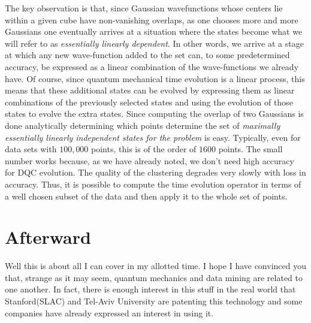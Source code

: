 \documentclass[fleqn,twoside]{article}
\begin{document}
The key observation is that, since Gaussian wavefunctions whose
centers lie within a given cube have non-vanishing overlaps, as one
chooses more and more Gaussians one eventually arrives at a
situation where the states become what we will refer to as {\it
essentially linearly dependent\/}.  In other words, we arrive at a
stage at which any new wave-function added to the set can, to some
predetermined accuracy, be expressed as a linear combination of the
wave-functions we already have.  Of course, since quantum mechanical
time evolution is a linear process, this means that these additional
states can be evolved by expressing them as linear combinations of the
previously selected states and using the evolution of those states
to evolve the extra states.  Since computing the overlap of two
Gaussians is done analytically determining which points determine
the set of {\it maximally essentially linearly independent states
for the problem\/} is easy. Typically, even for data sets with
$100,000$ points, this is of the order of $1600$ points.  The small
number works because, as we have already noted, we don't need high
accuracy for DQC evolution. The quality of the clustering degrades
very slowly with loss in accuracy. Thus, it is possible to compute the time
evolution operator in terms of a well chosen subset of the data and
then apply it to the whole set of points.

\section{Afterward}

Well this is about all I can cover in my allotted time.  I hope
I have convinced you that, strange as it may seem, quantum mechanics
and data mining are related to one another.  In fact, there is
enough interest in this stuff in the real world that Stanford(SLAC)
and Tel-Aviv University are patenting this technology and some
companies have already expressed an interest in using it.
\end{document}
